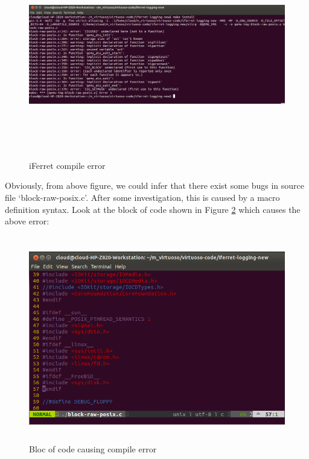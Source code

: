 \begin{figure}[htbp]
	\centering
		\includegraphics[width=14cm, height= 9cm ]{Figures/Figure33.png}
	\caption[iFerret compile error]{iFerret compile error}
	\label{fig:iFerret compile error}
\end{figure}

Obviously, from above figure, we could infer that there exist some bugs in source file ‘block-raw-posix.c’. After some investigation, 
this is caused by a macro definition syntax. Look at the block of code shown in Figure \ref{fig:Bloc of code causing compile error} which
causes the above error:

\begin{figure}[htbp]
	\centering
		\includegraphics[width=14cm, height= 9cm ]{Figures/Figure34.png}
	\caption[Bloc of code causing compile error]{Bloc of code causing compile error}
	\label{fig:Bloc of code causing compile error}
\end{figure}

